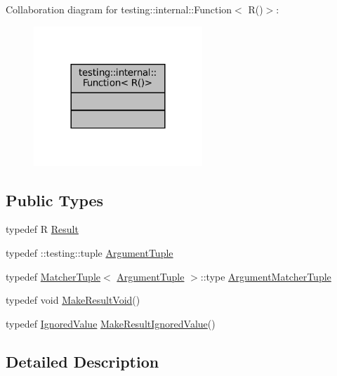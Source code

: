 Collaboration diagram for testing\+:\+:internal\+:\+:Function$<$ R()$>$\+:
\nopagebreak
\begin{figure}[H]
\begin{center}
\leavevmode
\includegraphics[width=180pt]{structtesting_1_1internal_1_1Function_3_01R_07_08_4__coll__graph}
\end{center}
\end{figure}
\subsection*{Public Types}
\begin{DoxyCompactItemize}
\item 
typedef R \hyperlink{structtesting_1_1internal_1_1Function_3_01R_07_08_4_a5c228a886ef598ac10988f8de5e32ca1}{Result}
\item 
typedef \+::testing\+::tuple \hyperlink{structtesting_1_1internal_1_1Function_3_01R_07_08_4_ad483c3128c470d8cdb55c3ac1c575c11}{Argument\+Tuple}
\item 
typedef \hyperlink{structtesting_1_1internal_1_1MatcherTuple}{Matcher\+Tuple}$<$ \hyperlink{structtesting_1_1internal_1_1Function_3_01R_07_08_4_ad483c3128c470d8cdb55c3ac1c575c11}{Argument\+Tuple} $>$\+::type \hyperlink{structtesting_1_1internal_1_1Function_3_01R_07_08_4_a9bec5cf8937e8af99dedab2f40129fab}{Argument\+Matcher\+Tuple}
\item 
typedef void \hyperlink{structtesting_1_1internal_1_1Function_3_01R_07_08_4_a666b5ad3bf155529d3a0f9fe6d5c897b}{Make\+Result\+Void}()
\item 
typedef \hyperlink{classtesting_1_1internal_1_1IgnoredValue}{Ignored\+Value} \hyperlink{structtesting_1_1internal_1_1Function_3_01R_07_08_4_aa459093a5b52ef54e2544b5a6c054383}{Make\+Result\+Ignored\+Value}()
\end{DoxyCompactItemize}


\subsection{Detailed Description}
